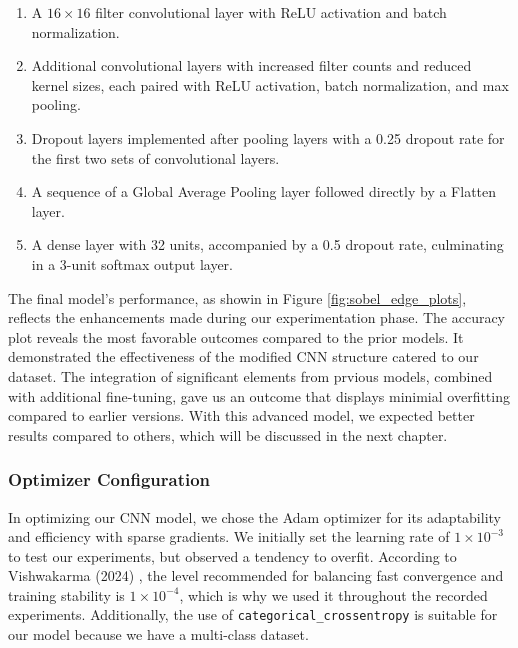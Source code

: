\begin{enumerate}
  \item A \(16 \times 16\) filter convolutional layer with ReLU activation and batch normalization.
  \item Additional convolutional layers with increased filter counts and reduced kernel sizes, each paired with ReLU activation, batch normalization, and max pooling.
  \item Dropout layers implemented after pooling layers with a 0.25 dropout rate for the first two sets of convolutional layers.
  \item A sequence of a Global Average Pooling layer followed directly by a Flatten layer.
  \item A dense layer with 32 units, accompanied by a 0.5 dropout rate, culminating in a 3-unit softmax output layer.
\end{enumerate}

The final model's performance, as showin in Figure \ref{fig:sobel_edge_plots}, reflects the enhancements made during our experimentation phase. The accuracy plot reveals the most favorable outcomes compared to the prior models. It demonstrated the effectiveness of the modified CNN structure catered to our dataset. The integration of significant elements from prvious models, combined with additional fine-tuning, gave us an outcome that displays minimial overfitting compared to earlier versions. With this advanced model, we expected better results compared to others, which will be discussed in the next chapter. 

\subsubsection{Optimizer Configuration}

In optimizing our CNN model, we chose the Adam optimizer for its adaptability and efficiency with sparse gradients. We initially set the learning rate of \(1 \times 10^{-3}\) to test our experiments, but observed a tendency to overfit. According to Vishwakarma (2024) \cite{adam_optimizer}, the level recommended for balancing fast convergence and training stability is \(1 \times 10^{-4}\), which is why we used it throughout the recorded experiments. Additionally, the use of \texttt{categorical_crossentropy} is suitable for our model because we have a multi-class dataset.